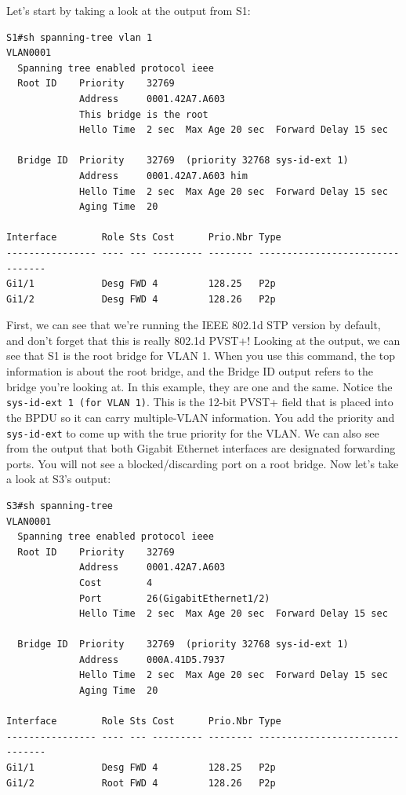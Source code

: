 \documentclass[b5paper,11pt]{memoir}
\begin{document}
Let's start by taking a look at the output from S1:

\begin{verbatim}
S1#sh spanning-tree vlan 1
VLAN0001
  Spanning tree enabled protocol ieee
  Root ID    Priority    32769
             Address     0001.42A7.A603
             This bridge is the root
             Hello Time  2 sec  Max Age 20 sec  Forward Delay 15 sec
 
  Bridge ID  Priority    32769  (priority 32768 sys-id-ext 1)
             Address     0001.42A7.A603 him
             Hello Time  2 sec  Max Age 20 sec  Forward Delay 15 sec
             Aging Time  20
 
Interface        Role Sts Cost      Prio.Nbr Type
---------------- ---- --- --------- -------- --------------------------------
Gi1/1            Desg FWD 4         128.25   P2p
Gi1/2            Desg FWD 4         128.26   P2p
\end{verbatim}

First, we can see that we're running the IEEE 802.1d STP version by
default, and don't forget that this is really 802.1d PVST+! Looking at
the output, we can see that S1 is the root bridge for VLAN 1. When you
use this command, the top information is about the root bridge, and the
Bridge ID output refers to the bridge you're looking at. In this
example, they are one and the same. Notice the
\texttt{sys-id-ext\ 1\ (for\ VLAN\ 1)}. This is the 12-bit PVST+ field
that is placed into the BPDU so it can carry multiple-VLAN information.
You add the priority and \texttt{sys-id-ext} to come up with the true
priority for the VLAN. We can also see from the output that both Gigabit
Ethernet interfaces are designated forwarding ports. You will not see a
blocked/discarding port on a root bridge. Now let's take a look at S3's
output:

\begin{verbatim}
S3#sh spanning-tree
VLAN0001
  Spanning tree enabled protocol ieee
  Root ID    Priority    32769
             Address     0001.42A7.A603
             Cost        4
             Port        26(GigabitEthernet1/2)
             Hello Time  2 sec  Max Age 20 sec  Forward Delay 15 sec
 
  Bridge ID  Priority    32769  (priority 32768 sys-id-ext 1)
             Address     000A.41D5.7937
             Hello Time  2 sec  Max Age 20 sec  Forward Delay 15 sec
             Aging Time  20
 
Interface        Role Sts Cost      Prio.Nbr Type
---------------- ---- --- --------- -------- --------------------------------
Gi1/1            Desg FWD 4         128.25   P2p
Gi1/2            Root FWD 4         128.26   P2p
\end{verbatim}
\end{document}
